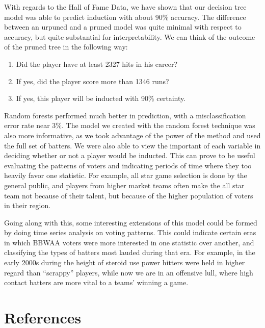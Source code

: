 \documentclass[preprint,12pt]{elsarticle}
\begin{document}
With regards to the Hall of Fame Data, we have shown that our decision tree model was able to predict induction with about 90\% accuracy. The difference between an urpuned and a pruned model was quite minimal with respect to accuracy, but quite substantial for interpretability. We can think of the outcome of the pruned tree in the following way:


\begin{enumerate}
	\item Did the player have at least 2327 hits in his career?
	\item If yes, did the player score more than 1346 runs?
	\item If yes, this player will be inducted with 90\% certainty. 
\end{enumerate}

Random forests performed much better in prediction, with a misclassification error rate near 3\%. The model we created with the random forest technique was also more informative, as we took advantage of the power of the method and used the full set of batters. We were also able to view the important of each variable in deciding whether or not a player would be inducted. This can prove to be useful evaluating the patterns of voters and indicating periods of time where they too heavily favor one statistic. For example, all star game selection is done by the general public, and players from higher market teams often make the all star team not because of their talent, but because of the higher population of voters in their region.

Going along with this, some interesting extensions of this model could be formed by doing time series analysis on voting patterns. This could indicate certain eras in which BBWAA voters were more interested in one statistic over another, and classifying the types of batters most lauded during that era. For example, in the early 2000s during the height of steroid use power hitters were held in higher regard than ``scrappy'' players, while now we are in an offensive lull, where high contact batters are more vital to a teams' winning a game.


\section{References}


\end{document}
